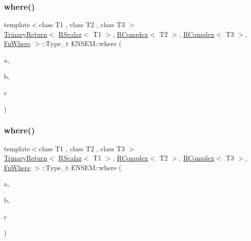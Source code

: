 \subsubsection{\texorpdfstring{where()}{where()}\hspace{0.1cm}{\footnotesize\ttfamily [1/3]}}
{\footnotesize\ttfamily template$<$class T1 , class T2 , class T3 $>$ \\
\mbox{\hyperlink{structENSEM_1_1TrinaryReturn}{Trinary\+Return}}$<$ \mbox{\hyperlink{classENSEM_1_1RScalar}{R\+Scalar}}$<$ T1 $>$, \mbox{\hyperlink{classENSEM_1_1RComplex}{R\+Complex}}$<$ T2 $>$, \mbox{\hyperlink{classENSEM_1_1RComplex}{R\+Complex}}$<$ T3 $>$, \mbox{\hyperlink{structENSEM_1_1FnWhere}{Fn\+Where}} $>$\+::Type\+\_\+t E\+N\+S\+E\+M\+::where (\begin{DoxyParamCaption}\item[{const \mbox{\hyperlink{classENSEM_1_1RScalar}{R\+Scalar}}$<$ T1 $>$ \&}]{a,  }\item[{const \mbox{\hyperlink{classENSEM_1_1RComplex}{R\+Complex}}$<$ T2 $>$ \&}]{b,  }\item[{const \mbox{\hyperlink{classENSEM_1_1RComplex}{R\+Complex}}$<$ T3 $>$ \&}]{c }\end{DoxyParamCaption})\hspace{0.3cm}{\ttfamily [inline]}}

\mbox{\label{group__rcomplex_gadf07511990ea74c6e0d3b72f19e880f3}} 
\subsubsection{\texorpdfstring{where()}{where()}\hspace{0.1cm}{\footnotesize\ttfamily [2/3]}}
{\footnotesize\ttfamily template$<$class T1 , class T2 , class T3 $>$ \\
\mbox{\hyperlink{structENSEM_1_1TrinaryReturn}{Trinary\+Return}}$<$ \mbox{\hyperlink{classENSEM_1_1RScalar}{R\+Scalar}}$<$ T1 $>$, \mbox{\hyperlink{classENSEM_1_1RComplex}{R\+Complex}}$<$ T2 $>$, \mbox{\hyperlink{classENSEM_1_1RComplex}{R\+Complex}}$<$ T3 $>$, \mbox{\hyperlink{structENSEM_1_1FnWhere}{Fn\+Where}} $>$\+::Type\+\_\+t E\+N\+S\+E\+M\+::where (\begin{DoxyParamCaption}\item[{const \mbox{\hyperlink{classENSEM_1_1RScalar}{R\+Scalar}}$<$ T1 $>$ \&}]{a,  }\item[{const \mbox{\hyperlink{classENSEM_1_1RComplex}{R\+Complex}}$<$ T2 $>$ \&}]{b,  }\item[{const \mbox{\hyperlink{classENSEM_1_1RScalar}{R\+Scalar}}$<$ T3 $>$ \&}]{c }\end{DoxyParamCaption})\hspace{0.3cm}{\ttfamily [inline]}}

